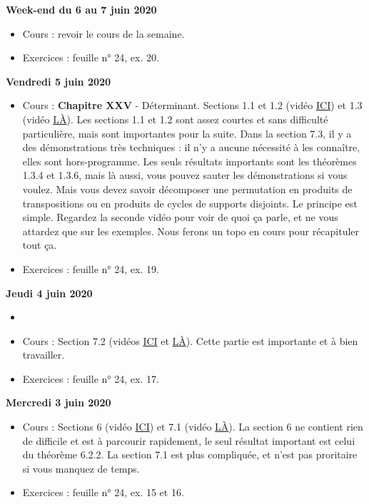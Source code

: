 \documentclass[12pt,a4paper]{article}
\begin{document}
\noindent\textbf{Week-end du 6 au 7 juin 2020}
\begin{itemize}
\item Cours : revoir le cours de la semaine.
\item Exercices : feuille n° 24, ex. 20.\vspace{.4cm}
\end{itemize}

\noindent\textbf{Vendredi 5 juin 2020}
\begin{itemize}
\item Cours : \textbf{Chapitre XXV} - Déterminant. Sections 1.1 et 1.2 (vidéo \href{https://youtu.be/s-WUHnSWgLs}{ ICI}) et 1.3 (vidéo \href{https://youtu.be/UtaFPRkdxU8}{ LÀ}). Les sections 1.1 et 1.2 sont assez courtes et sans difficulté particulière, mais sont importantes pour la suite. Dans la section 7.3, il y a des démonstrations très techniques : il n'y a aucune nécessité à les connaître, elles sont hors-programme. Les seuls résultats importants sont les théorèmes 1.3.4 et 1.3.6, mais là aussi, vous pouvez sauter les démonstrations si vous voulez. Mais vous devez savoir décomposer une permutation en produits de transpositions ou en produits de cycles de supports disjoints. Le principe est simple. Regardez la seconde vidéo pour voir de quoi ça parle, et ne vous attardez que sur les exemples. Nous ferons un topo en cours pour récapituler tout ça.
\item Exercices : feuille n° 24, ex. 19.\vspace{.4cm}
\end{itemize}

\noindent\textbf{Jeudi 4 juin 2020}
\begin{itemize}
\item 
\item Cours : Section 7.2 (vidéos \href{https://youtu.be/uxTWn1yr0dE}{ ICI} et \href{https://youtu.be/AtZB0jCKsfM}{ LÀ}). Cette partie est importante et à bien travailler.
\item Exercices : feuille n° 24, ex. 17.\vspace{.4cm}
\end{itemize}
 
\noindent\textbf{Mercredi 3 juin 2020}
\begin{itemize}
\item Cours : Sections 6 (vidéo \href{https://youtu.be/eLJ-axFV7ag}{ ICI}) et 7.1 (vidéo \href{https://youtu.be/0K9zS6irk18}{ LÀ}). La section 6 ne contient rien de difficile et est à parcourir rapidement, le seul résultat important est celui du théorème 6.2.2. La section 7.1 est plus compliquée, et n'est pas proritaire si vous manquez de temps.
\item Exercices : feuille n° 24, ex. 15 et 16.\vspace{.4cm}
\end{itemize}
\end{document}
